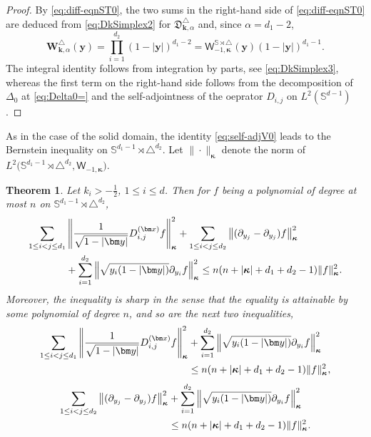 \documentclass{amsart}
\newtheorem{thm}{Theorem}[section]
\theoremstyle{remark}
\def\sph{{\mathbb{S}^{d-1}}}
\def\sW{{\mathsf W}}
\def\fD{{\mathfrak D}}
\def\a{{\alpha}}
\def\l{{\lambda}}
\def\kb{{\bm k}}
\def\yb{{\bm y}}
\def\Wb{{\bm W}}
\def\SS{{\mathbb S}}
\def\bk{{\boldsymbol{\kappa}}}
\def\f{\frac}
\begin{document}
\begin{proof}
By \eqref{eq:diff-eqnST0}, the two sums in the right-hand side of \eqref{eq:diff-eqnST0} are deduced
from \eqref{eq:DkSimplex2} for $\fD_{\kb,\a}^\triangle$ and, since $\a = d_1-2$,
$$
   \Wb_{\kb,\a}^\triangle(\yb) = \prod_{i=1}^{d_2} (1-|\yb|)^{d_1-2} = 
      \sW_{-1, \bk}^{\SS \rtimes \triangle}(\yb) (1-|\yb|)^{d_1-1}.
$$
The integral identity follows from integration by parts, see \eqref{eq:DkSimplex3}, whereas the first term 
on the right-hand side follows from the decomposition of $\Delta_0$ at \eqref{eq:Delta0=} and the 
self-adjointness of the oeprator $D_{i,j}$ on $L^2(\sph)$. 
\end{proof}

As in the case of the solid domain, the identity \eqref{eq:self-adjV0} leads to the Bernstein inequality on 
$\SS^{d_1-1} \!\rtimes \triangle^{d_2}$. Let $\|\cdot \|_\bk$ denote the norm of $L^2\big(\SS^{d_1-1} \!\rtimes \triangle^{d_2}, \sW_{-1,\bk}\big)$. 

\begin{thm} 
Let $k_i > -\f12$, $1 \le i \le d$. Then for $f$ being a polynomial of degree at most $n$ on $\SS^{d_1-1} \!\rtimes \triangle^{d_2}$, 
\begin{align}\label{eq:B2_0}
 \sum_{1 \le i< j \le d_1} & \left \| \frac{1}{\sqrt{1-|\bm y|}}  D_{i,j}^{(\bm x)} f \right \|_{\bk}^2   + 
  \sum_{1\le i< j \le d_2} \left\| (\partial_{y_j} - \partial_{y_j}) f \right\|_{\bk} ^2 \\
    & + 
   \sum_{i=1}^{d_2} \left \| \sqrt{y_i  (1-|\bm y|)}  \partial_{y_i} f\right\|_{\bk} ^2 
   \le   n(n+ |\bk| + d_1 + d_2-1)\|f\|_{\bk}^2. \notag
\end{align}
Moreover, the inequality is sharp in the sense that the equality is attainable by some polynomial of degree $n$, and 
so are the next two inequalities,
\begin{align}\label{eq:B2_0A}
 \sum_{1 \le i< j \le d_1}  \left \| \frac{1}{\sqrt{1-|\bm y|}}  D_{i,j}^{(\bm x)} f \right \|_{\bk}^2   
    & +   \sum_{i=1}^{d_2} \left \| \sqrt{y_i  (1-|\bm y|)}  \partial_{y_i} f\right\|_{\bk} ^2 \\
    & \le   n(n+ |\bk| + d_1 + d_2-1)\|f\|_{\bk}^2, \notag
\end{align}
\begin{align}\label{eq:B2_0B}
  \sum_{1\le i< j \le d_2} \left\| (\partial_{y_j} - \partial_{y_j}) f \right\|_{\bk} ^2 & + 
   \sum_{i=1}^{d_2} \left \| \sqrt{y_i  (1-|\bm y|)}  \partial_{y_i} f\right\|_{\bk} ^2 \\
  & \le   n(n+ |\bk| + d_1 + d_2-1)\|f\|_{\bk}^2. \notag
\end{align}
\end{thm}
\end{document}
